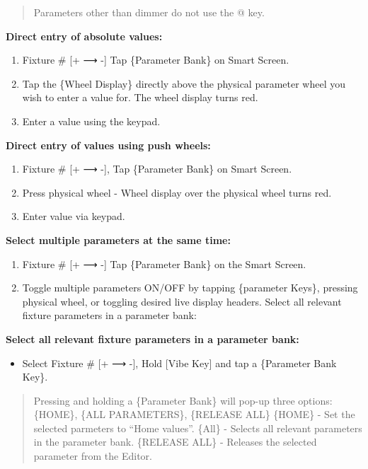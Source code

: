\documentclass[
]{article}
\providecommand{\tightlist}{%
  \setlength{\itemsep}{0pt}\setlength{\parskip}{0pt}}
\begin{document}
\begin{quote}
{Parameters other than dimmer do not use the @ key.}
\end{quote}

\textbf{Direct entry of absolute values:}

\begin{enumerate}
\def\labelenumi{\arabic{enumi}.}
\item
  Fixture \# {[}+ ⟶ -{]} Tap \{Parameter Bank\} on Smart Screen.
\item
  Tap the \{Wheel Display\} directly above the physical parameter wheel you wish to enter a value for. The wheel display turns red.
\item
  Enter a value using the keypad.
\end{enumerate}

\textbf{Direct entry of values using push wheels:}

\begin{enumerate}
\def\labelenumi{\arabic{enumi}.}
\item
  Fixture \# {[}+ ⟶ -{]}, Tap \{Parameter Bank\} on Smart Screen.
\item
  Press physical wheel - Wheel display over the physical wheel turns red.
\item
  Enter value via keypad.
\end{enumerate}

\textbf{Select multiple parameters at the same time:}

\begin{enumerate}
\def\labelenumi{\arabic{enumi}.}
\item
  Fixture \# {[}+ ⟶ -{]} Tap \{Parameter Bank\} on the Smart Screen.
\item
  Toggle multiple parameters ON/OFF by tapping \{parameter Keys\}, pressing physical wheel, or toggling desired live display headers. Select all relevant fixture parameters in a parameter bank:
\end{enumerate}

\textbf{Select all relevant fixture parameters in a parameter bank:}

\begin{itemize}
\tightlist
\item
  Select Fixture \# {[}+ ⟶ -{]}, Hold {[}Vibe Key{]} and tap a \{Parameter Bank Key\}.
\end{itemize}

\begin{quote}
Pressing and holding a \{Parameter Bank\} will pop-up three options: \{HOME\}, \{ALL PARAMETERS\}, \{RELEASE ALL\} \{HOME\} - Set the selected parmeters to ``Home values''. \{All\} - Selects all relevant parameters in the parameter bank. \{RELEASE ALL\} - Releases the selected parameter from the Editor.
\end{quote}
\end{document}

